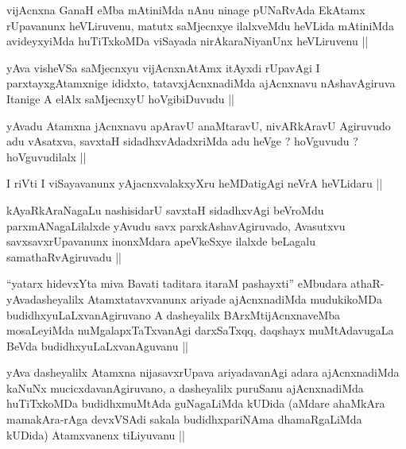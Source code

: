 \begin{artha}
vijAcnxna GanaH eMba mAtiniMda nAnu ninage pUNaRvAda EkAtamx
rUpavanunx heVLiruvenu, matutx saMjecnxye ilalxveMdu heVLida mAtiniMda
avideyxyiMda huTiTxkoMDa viSayada nirAkaraNiyanUnx heVLiruvenu ||
\end{artha}

\begin{artha}
yAva visheVSa saMjecnxyu vijAcnxnAtAmx itAyxdi rUpavAgi I
parxtayxgAtamxnige ididxto, tatavxjAcnxnadiMda ajAcnxnavu
nAshavAgiruva Itanige A elAlx saMjecnxyU hoVgibiDuvudu ||
\end{artha}

\begin{artha}
yAvadu Atamxna jAcnxnavu apAravU anaMtaravU, nivARkAravU Agiruvudo adu
vAsatxva, savxtaH sidadhxvAdadxriMda adu heVge ? hoVguvudu ?
hoVguvudilalx ||
\end{artha}

\begin{artha}
I riVti I viSayavanunx yAjacnxvalakxyXru heMDatigAgi neVrA heVLidaru ||
\end{artha}

\begin{artha}
kAyaRkAraNagaLu nashisidarU savxtaH sidadhxvAgi beVroMdu
parxmANagaLilalxde yAvudu savx parxkAshavAgiruvado, Avasutxvu
savxsavxrUpavanunx inonxMdara apeVkeSxye ilalxde beLagalu
samathaRvAgiruvadu ||
\end{artha}

\begin{artha}
``yatarx hidevxYta miva Bavati taditara itaraM pashayxti'' eMbudara
  athaR- yAvadasheyalilx Atamxtatavxvanunx ariyade ajAcnxnadiMda
  mudukikoMDa budidhxyuLaLxvanAgiruvano A dasheyalilx
  BArxMtijAcnxnaveMba mosaLeyiMda nuMgalapxTaTxvanAgi darxSaTxqq,
  daqshayx muMtAdavugaLa BeVda budidhxyuLaLxvanAguvanu ||
\end{artha}

\begin{artha}
yAva dasheyalilx Atamxna nijasavxrUpava ariyadavanAgi adara
ajAcnxnadiMda kaNuNx mucicxdavanAgiruvano, a dasheyalilx puruSanu
ajAcnxnadiMda huTiTxkoMDa budidhxmuMtAda guNagaLiMda kUDida (aMdare
ahaMkAra mamakAra-rAga devxVSAdi sakala budidhxpariNAma dhamaRgaLiMda
kUDida) Atamxvanenx tiLiyuvanu ||
\end{artha}


\begin{artha}

\end{artha}

